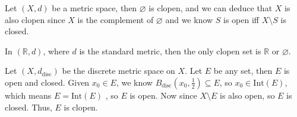 \begin{remark}
    Let \((X, d)\) be a metric space, then \(\varnothing \) is clopen, and we can deduce that \(X\) is also clopen since \(X\) is the complement of \(\varnothing \) and we know \(S\) is open iff \(X\setminus S\) is closed.      
\end{remark}

\begin{remark}
    In \((\mathbb{R} , d)\), where \(d\) is the standard metric, then the only clopen set is \(\mathbb{R} \) or \(\varnothing \).    
\end{remark}

\begin{remark}
    Let \((X, d_{\mathrm{disc} })\) be the discrete metric space on \(X\). Let \(E\) be any set, then \(E\) is open and closed. Given \(x_0 \in E\), we know \(B_{\mathrm{disc} }\left( x_0, \frac{1}{2} \right) \subseteq E\), so \(x_0 \in \mathrm{Int}(E) \), which means \(E = \mathrm{Int}(E) \) , so \(E\) is open. Now since \(X \setminus E\) is also open, so \(E\) is closed. Thus, \(E\) is clopen.        
\end{remark}

